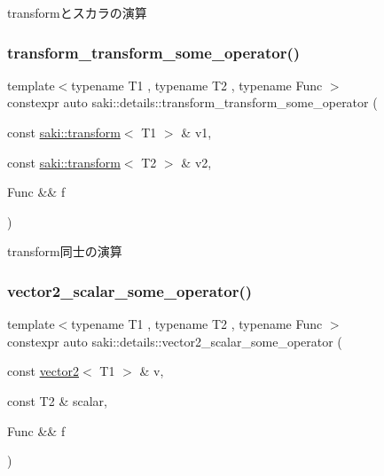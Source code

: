 transformとスカラの演算 

\mbox{\label{namespacesaki_1_1details_a9cc45efebcefc4c153ed6ddd63de93f7}} 
\subsubsection{\texorpdfstring{transform\+\_\+transform\+\_\+some\+\_\+operator()}{transform\_transform\_some\_operator()}}
{\footnotesize\ttfamily template$<$typename T1 , typename T2 , typename Func $>$ \\
constexpr auto saki\+::details\+::transform\+\_\+transform\+\_\+some\+\_\+operator (\begin{DoxyParamCaption}\item[{const \mbox{\hyperlink{classsaki_1_1transform}{saki\+::transform}}$<$ T1 $>$ \&}]{v1,  }\item[{const \mbox{\hyperlink{classsaki_1_1transform}{saki\+::transform}}$<$ T2 $>$ \&}]{v2,  }\item[{Func \&\&}]{f }\end{DoxyParamCaption})}



transform同士の演算 

\mbox{\label{namespacesaki_1_1details_a02e93149670af3f28e74fcb7dbcf4fa9}} 
\subsubsection{\texorpdfstring{vector2\+\_\+scalar\+\_\+some\+\_\+operator()}{vector2\_scalar\_some\_operator()}}
{\footnotesize\ttfamily template$<$typename T1 , typename T2 , typename Func $>$ \\
constexpr auto saki\+::details\+::vector2\+\_\+scalar\+\_\+some\+\_\+operator (\begin{DoxyParamCaption}\item[{const \mbox{\hyperlink{classsaki_1_1vector2}{vector2}}$<$ T1 $>$ \&}]{v,  }\item[{const T2 \&}]{scalar,  }\item[{Func \&\&}]{f }\end{DoxyParamCaption})}



